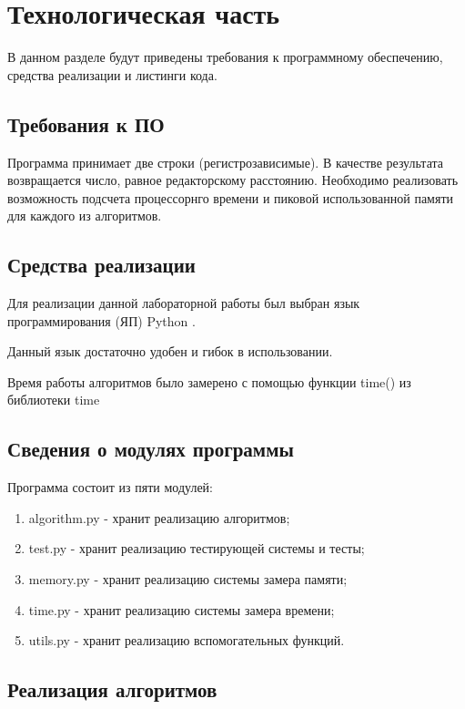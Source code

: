 \chapter{Технологическая часть}

В данном разделе будут приведены требования к программному обеспечению, средства реализации и листинги кода.

\section{Требования к ПО}

Программа принимает две строки (регистрозависимые). В качестве результата возвращается число, равное редакторскому расстоянию. Необходимо реализовать возможность подсчета процессорнго времени и пиковой использованной памяти для каждого из алго­ритмов.

\section{Средства реализации}

Для реализации данной лабораторной работы был выбран язык программирования (ЯП) Python \cite{pythonlang}. 

Данный язык достаточно удобен и гибок в использовании. 

Время работы алгоритмов было замерено с помощью функции time() из библиотеки time \cite{pythonlangtime}

\section{Сведения о модулях программы}
Программа состоит из пяти модулей:
\begin{enumerate}
	\item algorithm.py - хранит реализацию алгоритмов;
	\item test.py - хранит реализацию тестирующей системы и тесты;
	\item memory.py - хранит реализацию системы замера памяти;
	\item time.py - хранит реализацию системы замера времени;
	\item utils.py - хранит реализацию вспомогательных функций.
\end{enumerate}


\section{Реализация алгоритмов}

